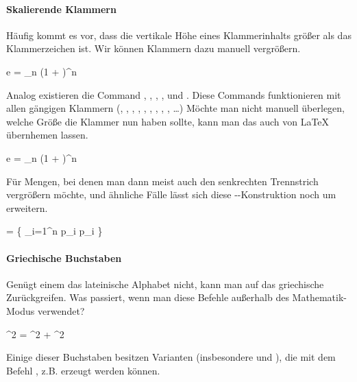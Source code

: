 \paragraph{Skalierende Klammern} Häufig kommt es vor, dass die vertikale Höhe eines Klammerinhalts größer als das Klammerzeichen ist.
Wir können Klammern dazu manuell vergrößern.
\begin{latexlisting}
	e = \lim_{n \to \infty} \bigl(1 +  \bigr)^n
\end{latexlisting}
Analog existieren die Command , , , ,  und .
Diese Commands funktionieren mit allen gängigen Klammern (\key{[}, \key{]}, \latexcommand{\{}, \latexcommand{\}}, , , \latexcommand{\|}, \latexcommand{\|}, \key{|}, \dots)
Möchte man nicht manuell überlegen, welche Größe die Klammer nun haben sollte, kann man das auch von \LaTeX{} übernhemen lassen.
\begin{latexlisting}
	e = \lim_{n \to \infty} \left(1 +  \right)^n
\end{latexlisting}
Für Mengen, bei denen man dann meist auch den senkrechten Trennstrich vergrößern möchte, und ähnliche Fälle lässt sich diese --Konstruktion noch um  erweitern.
\begin{latexlisting}
	 = \left\{ \prod_{i=1}^n p_i \middle \mid p_i \in {} \right\}
\end{latexlisting}

\paragraph{Griechische Buchstaben} Genügt einem das lateinische Alphabet nicht, kann man auf das griechische Zurückgreifen.
Was passiert, wenn man diese Befehle außerhalb des Mathematik-Modus verwendet?
\begin{latexlisting}
	\alpha^2 = \beta^2 + \gamma^2 \qquad \omega \neq \Omega
\end{latexlisting}
Einige dieser Buchstaben besitzen Varianten (insbesondere  und ), die mit dem Befehl , z.B.  erzeugt werden können.

